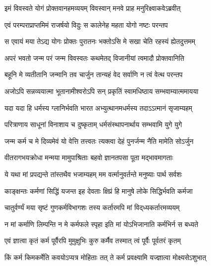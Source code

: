 

\twolineshloka
{इमं विवस्वते योगं प्रोक्तवानहमव्ययम्}
{विवस्वान् मनवे प्राह मनुरिक्ष्वाकवेऽब्रवीत्}%

\twolineshloka
{एवं परम्पराप्राप्तमिमं राजर्षयो विदुः}
{स कालेनेह महता योगो नष्टः परन्तप}%

\twolineshloka
{स एवायं मया तेऽद्य योगः प्रोक्तः पुरातनः}
{भक्तोऽसि मे सखा चेति रहस्यं ह्येतदुत्तमम्}%


\twolineshloka
{अपरं भवतो जन्म परं जन्म विवस्वतः}
{कथमेतद् विजानीयां त्वमादौ प्रोक्तवानिति}%


\twolineshloka
{बहूनि मे व्यतीतानि जन्मानि तव चार्जुन}
{तान्यहं वेद सर्वाणि न त्वं वेत्थ परन्तप}%

\twolineshloka
{अजोऽपि सन्नव्ययात्मा भूतानामीश्वरोऽपि सन्}
{प्रकृतिं स्वामधिष्ठाय सम्भवाम्यात्ममायया}%

\twolineshloka
{यदा यदा हि धर्मस्य ग्लानिर्भवति भारत}
{अभ्युत्थानमधर्मस्य तदाऽऽत्मानं सृजाम्यहम्}%

\twolineshloka
{परित्राणाय साधूनां विनाशाय च दुष्कृताम्}
{धर्मसंस्थापनार्थाय सम्भवामि युगे युगे}%

\twolineshloka
{जन्म कर्म च मे दिव्यमेवं यो वेत्ति तत्त्वतः}
{त्यक्त्वा देहं पुनर्जन्म नैति मामेति सोऽर्जुन}%

\twolineshloka
{वीतरागभयक्रोधा मन्मया मामुपाश्रिताः}
{बहवो ज्ञानतपसा पूता मद्भावमागताः}%

\twolineshloka
{ये यथा मां प्रपद्यन्ते तांस्तथैव भजाम्यहम्}
{मम वर्त्मानुवर्तन्ते मनुष्याः पार्थ सर्वशः}%

\twolineshloka
{काङ्क्षन्तः कर्मणां सिद्धिं यजन्त इह देवताः}
{क्षिप्रं हि मानुषे लोके सिद्धिर्भवति कर्मजा}%

\twolineshloka
{चातुर्वर्ण्यं मया सृष्टं गुणकर्मविभागशः}
{तस्य कर्तारमपि मां विद्‌ध्यकर्तारमव्ययम्}%

\twolineshloka
{न मां कर्माणि लिम्पन्ति न मे कर्मफले स्पृहा}
{इति मां योऽभिजानाति कर्मभिर्न स बध्यते}%

\twolineshloka
{एवं ज्ञात्वा कृतं कर्म पूर्वैरपि मुमुक्षुभिः}
{कुरु कर्मैव तस्मात् त्वं पूर्वैः पूर्वतरं कृतम्}%

\twolineshloka
{किं कर्म किमकर्मेति कवयोऽप्यत्र मोहिताः}
{तत् ते कर्म प्रवक्ष्यामि यज्ज्ञात्वा मोक्ष्यसेऽशुभात्}%

